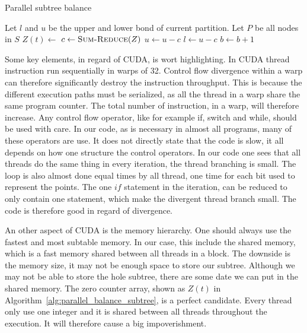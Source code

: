 \begin{algorithm}[ht]
\caption{Parallel subtree balance}
\label{alg:parallel_balance_subtree}
\begin{algorithmic}
        \State Let $l$ and $u$ be the upper and lower bond of current partition.
        \State Let $P$ be all nodes in $S$
        \Repeat
                \State $Z(t) \gets $  
            \EndFor
            \State $c \gets \Call{Sum-Reduce}{Z}$ 
                \State$ u \gets u-c$
            \Else
                \State$l \gets u-c$
            \EndIf
            \State $b \gets b+1$ 
            \State {}
        \State {}
    \EndFunction
\end{algorithmic}
\end{algorithm}


Some key elements, in regard of CUDA\@, is wort highlighting. In CUDA thread instruction run sequentially in warps of 32. Control flow divergence within a warp can therefore significantly destroy the instruction throughput. This is because the different execution paths must be serialized, as all the thread in a warp share the same program counter\cite{cuda_c_best_practices_guide}. The total number of instruction, in a warp, will therefore increase. Any control flow operator, like for example if, switch and while, should be used with care. In our code, as is necessary in almost all programs, many of these operators are use. It does not directly state that the code is slow, it all depends on how one structure the control operators. In our code one sees that all threads do the same thing in every iteration, the thread branching is small. The loop is also almost done equal times by all thread, one time for each bit used to represent the points. The one $if$ statement in the iteration, can be reduced to only contain one statement, which make the divergent thread branch small. The code is therefore good in regard of divergence.

An other aspect of CUDA is the memory hierarchy. One should always use the fastest and most subtable memory. In our case, this include the shared memory, which is a fast memory shared between all threads in a block. The downside is the memory size, it may not be enough space to store our subtree. Although we may not be able to store the hole subtree, there are some date we can put in the shared memory. The zero counter array, shown as $Z(t)$ in Algorithm~\ref{alg:parallel_balance_subtree}, is a perfect candidate. Every thread only use one integer and it is shared between all threads throughout the execution. It will therefore cause a big impoverishment.

